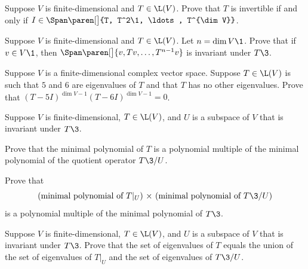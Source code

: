 \exercise
Suppose $V$ is finite-dimensional and $T \in \L(V)$.  Prove that $T$ is invertible if and only if
$I \in \Span\paren[\big]{T, T^2\1, \ldots, T^{\dim V}}$.


\exercise
Suppose $V$ is finite-dimensional and $T \in \L(V)$. Let $n = \dim V\1$. Prove that if $v \in V\1$, then
$
\Span\paren[\big]{v, Tv, \ldots, T^{n-1}v}
$
is invariant under $T\3$.


\exercise
Suppose $V$ is a finite-dimensional complex vector space.  Suppose $T \in \L(V)$ is such that $5$
and $6$ are eigenvalues of $T$ and that $T$ has no other eigenvalues.  Prove
that
$
(T - 5I)^{\dim V-1} (T - 6I)^{\dim V-1} = 0$.


\exercise
Suppose $V$ is finite-dimensional, $T \in \L(V)$, and $U$ is a subspace of $V$ that is invariant under $T\3$.\label{8minq}
\begin{subtheorem}
\item
Prove that the minimal polynomial of $T$ is a polynomial multiple of the minimal polynomial of the quotient operator $T\3/U$.
\item
Prove that
\[
\text{(minimal polynomial of $T|_U$) $\times$ (minimal polynomial of $T\3/U$)}
\]
is a polynomial multiple of the minimal polynomial of $T\3$.
\end{subtheorem}
\vspace{-0.03in}


\exercise
Suppose $V$ is finite-dimensional, $T \in \L(V)$, and $U$ is a subspace of $V$ that is invariant under $T\3$. Prove that the set of eigenvalues of $T$ equals the union of the set of eigenvalues of $T|_U$ and the set of eigenvalues of $T\3/U$.

